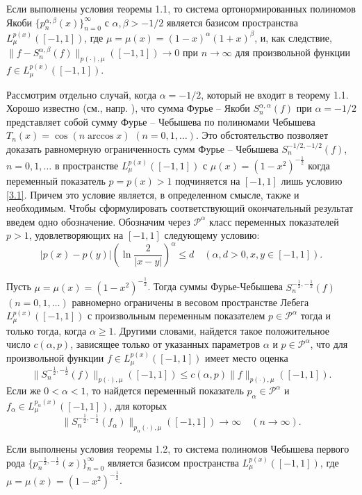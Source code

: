 \begin{corollary}
Если выполнены условия теоремы 1.1,  то  система ортонормированных  полиномов  Якоби $\{p_n^{\alpha,\beta}(x)\}_{n=0}^\infty$ с $\alpha,\beta>-1/2$ является базисом пространства  $L^{p(x)}_\mu([-1,1])$, где $\mu=\mu(x)=(1-x)^\alpha(1+x)^\beta$, и, как следствие, $\|f-S_n^{\alpha,\beta}(f)\|_{p(\cdot),\mu}([-1,1])\to0$ при $n\to\infty$ для произвольной функции $f\in L^{p(x)}_\mu([-1,1])$.
\end{corollary}



Рассмотрим отдельно случай, когда $\alpha=-1/2$, который не входит в теорему 1.1. Хорошо известно (см., напр. \cite{ShIIBJWSege}), что сумма Фурье -- Якоби  $S_n^{\alpha,\alpha}(f)$ при $\alpha=-1/2$ представляет собой сумму Фурье -- Чебышева по полиномами Чебышева $T_n(x)=\cos(n\arccos x)$ $(n=0,1,\ldots)$. Это обстоятельство позволяет доказать равномерную ограниченность сумм Фурье -- Чебышева $S_n^{-1/2,-1/2}(f)$, $n=0,1,\ldots$  в пространстве $L_\mu^{p(x)}([-1,1])$ с $\mu(x)=(1-x^2)^{-\frac12}$ когда переменный показатель $p=p(x)>1$ подчиняется на $[-1,1]$ лишь условию \eqref{3.1}.  Причем это условие является, в определенном смысле, также и необходимым. Чтобы сформулировать соответствующий окончательный результат введем  одно обозначение. Обозначим через $\mathcal{ P}^\alpha$ класс переменных показателей $p>1$, удовлетворяющих на $[-1,1]$ следующему условию:
\begin{equation}\label{8.97}
|p(x)-p(y)|\left(\ln\frac{2}{|x-y|}\right)^\alpha\le d\quad(\alpha,d>0, x,y\in[-1,1]).
\end{equation}

\begin{theorem}
Пусть  $\mu=\mu(x)=(1-x^2)^{-\frac12}$. Тогда суммы Фурье-Чебышева $S_n^{-\frac12,-\frac12}(f)$ $(n=0,1,\ldots)$
равномерно ограничены в весовом пространстве Лебега $L_\mu^{p(x)}([-1,1])$ с произвольным переменным показателем $p\in \mathcal{ P}^\alpha$ тогда и только тогда, когда $\alpha\ge1$. Другими словами, найдется такое положительное число $c(\alpha,p)$, зависящее только от указанных параметров $\alpha$ и $p\in \mathcal{ P}^\alpha$,     что для произвольной функции $f\in L_\mu^{p(x)}([-1,1])$ имеет место оценка
\begin{equation}\label{8.98}
\|S_n^{-\frac12,-\frac12}(f)\|_{p(\cdot),\mu}([-1,1])\le c(\alpha,p)\|f\|_{p(\cdot),\mu}([-1,1]).
\end{equation}
Если же $0<\alpha<1$, то найдется переменный показатель $p_\alpha\in \mathcal{P}^\alpha$ и $f_\alpha\in L_\mu^{p_\alpha(x)}([-1,1])$,
для которых
\begin{equation}\label{8.99}
\|S_n^{-\frac12,-\frac12}(f_\alpha)\|_{p_\alpha(\cdot),\mu}([-1,1])\to\infty\quad(n\to\infty).
\end{equation}
\end{theorem}









\begin{corollary}
  Если выполнены условия теоремы 1.2,  то система полиномов Чебышева первого рода $\{p_n^{-\frac12,-\frac12}(x)\}_{n=0}^\infty$  является базисом пространства  $L^{p(x)}_\mu([-1,1])$, где $\mu=\mu(x)=(1-x^2)^{-\frac12}$.
\end{corollary}
